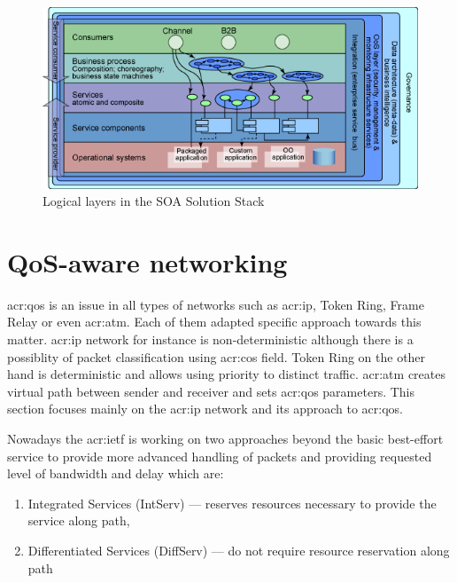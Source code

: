 \documentclass[11pt,openany]{book}
\begin{document}
        \begin{figure}[h]
          \begin{center}
            \includegraphics[scale=.5]{img/ctx/soa-stack.png}
          \end{center}

          \caption{Logical layers in the SOA Solution Stack \cite{soa-stack}}
          \label{fig:ctx:soa-stack}
        \end{figure}


    \section{QoS-aware networking}
    \label{sec:ctx:qos}

      \gls{acr:qos} is an issue in all types of networks such as \gls{acr:ip}, Token Ring, Frame Relay or even
      \gls{acr:atm}.  Each of them adapted specific approach towards this matter. \gls{acr:ip} network for instance is
      non-deterministic although there is a possiblity of packet classification using \gls{acr:cos} field. Token Ring on
      the other hand is deterministic and allows using priority to distinct traffic. \gls{acr:atm} creates virtual path
      between sender and receiver and sets \gls{acr:qos} parameters. This section focuses mainly on the \gls{acr:ip}
      network and its approach to \gls{acr:qos}.

      Nowadays the \gls{acr:ietf} is working on two approaches beyond the basic best-effort service to provide more
      advanced handling of packets and providing requested level of bandwidth and delay which are:

      \begin{enumerate}
        \item Integrated Services (IntServ) --- reserves resources necessary to provide the service along path,
        \item Differentiated Services (DiffServ) --- do not require resource reservation along path
      \end{enumerate}
\end{document}
